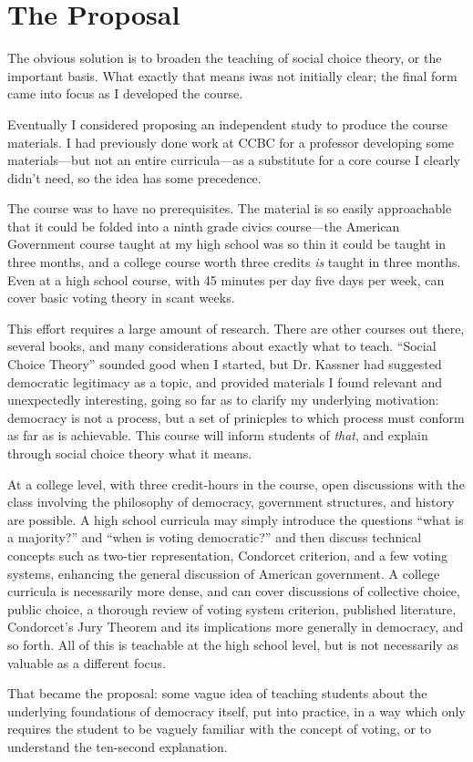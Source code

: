 
\chapter{The Proposal}

The obvious solution is to broaden the teaching of social choice theory, or the important basis.  What exactly that means iwas not initially clear; the final form came into focus as I developed the course.

Eventually I considered proposing an independent study to produce the course materials.  I had previously done work at CCBC for a professor developing some materials—but not an entire curricula—as a substitute for a core course I clearly didn't need, so the idea has some precedence.

The course was to have no prerequisites.  The material is so easily approachable that it could be folded into a ninth grade civics course—the American Government course taught at my high school was so thin it could be taught in three months, and a college course worth three credits \textit{is} taught in three months.  Even at a high school course, with 45 minutes per day five days per week, can cover basic voting theory in scant weeks.

This effort requires a large amount of research.  There are other courses out there, several books, and many considerations about exactly what to teach.  ``Social Choice Theory'' sounded good when I started, but Dr. Kassner had suggested democratic legitimacy as a topic, and provided materials I found relevant and unexpectedly interesting, going so far as to clarify my underlying motivation:  democracy is not a process, but a set of prinicples to which process must conform as far as is achievable.  This course will inform students of \textit{that}, and explain through social choice theory what it means.

At a college level, with three credit-hours in the course, open discussions with the class involving the philosophy of democracy, government structures, and history are possible.  A high school curricula may simply introduce the questions ``what is a majority?'' and ``when is voting democratic?'' and then discuss technical concepts such as two-tier representation, Condorcet criterion, and a few voting systems, enhancing the general discussion of American government.  A college curricula is necessarily more dense, and can cover discussions of collective choice, public choice, a thorough review of voting system criterion, published literature, Condorcet's Jury Theorem and its implications more generally in democracy, and so forth.  All of this is teachable at the high school level, but is not necessarily as valuable as a different focus.

That became the proposal:  some vague idea of teaching students about the underlying foundations of democracy itself, put into practice, in a way which only requires the student to be vaguely familiar with the concept of voting, or to understand the ten-second explanation.

